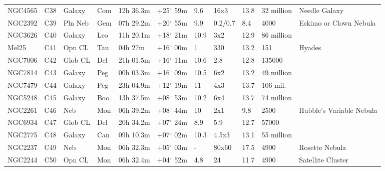 \documentclass[10pt,twoside,a4paper,english]{article}
\begin{document}
\begin{longtable}{@{}lllllllllll@{}}
NGC4565    & C38           & Galaxy  & Com & 12h 36.3m & +25$^{\circ}$ 59m & 9.6  & 16x3           & 13.8 & 32 million    & Needle Galaxy                   \\ 
NGC2392    & C39           & Pln Neb & Gem & 07h 29.2m & +20$^{\circ}$ 55m & 9.9  & 0.2/0.7        & 8.4  & 4000          & Eskimo or Clown Nebula          \\ 
NGC3626    & C40           & Galaxy  & Leo & 11h 20.1m & +18$^{\circ}$ 21m & 10.9 & 3x2            & 12.9 & 86 million    &                                 \\ 
Mel25      & C41           & Opn CL  & Tau & 04h 27m   & +16$^{\circ}$ 00m & 1    & 330            & 13.2 & 151           & Hyades                          \\ 
NGC7006    & C42           & Glob CL & Del & 21h 01.5m & +16$^{\circ}$ 11m & 10.6 & 2.8            & 12.8 & 135000        &                                 \\ 
NGC7814    & C43           & Galaxy  & Peg & 00h 03.3m & +16$^{\circ}$ 09m & 10.5 & 6x2            & 13.2 & 49 million    &                                 \\ 
NGC7479    & C44           & Galaxy  & Peg & 23h 04.9m & +12$^{\circ}$ 19m & 11   & 4x3            & 13.7 & 106 mil.      &                                 \\ 
NGC5248    & C45           & Galaxy  & Boo & 13h 37.5m & +08$^{\circ}$ 53m & 10.2 & 6x4            & 13.7 & 74 million    &                                 \\ 
NGC2261    & C46           & Neb     & Mon & 06h 39.2m & +08$^{\circ}$ 44m & 10   & 2x1            & 9.8  & 2500          & Hubble's Variable Nebula        \\ 
NGC6934    & C47           & Glob CL & Del & 20h 34.2m & +07$^{\circ}$ 24m & 8.9  & 5.9            & 12.7 & 57000         &                                 \\ 
NGC2775    & C48           & Galaxy  & Can & 09h 10.3m & +07$^{\circ}$ 02m & 10.3 & 4.5x3          & 13.1 & 55 million    &                                 \\ 
NGC2237    & C49           & Neb     & Mon & 06h 32.3m & +05$^{\circ}$ 03m & -    & 80x60          & 17.5 & 4900          & Rosette Nebula                  \\ 
NGC2244    & C50           & Opn CL  & Mon & 06h 32.4m & +04$^{\circ}$ 52m & 4.8  & 24             & 11.7 & 4900          & Satellite Cluster               \\ 

\end{longtable}
\end{document}
